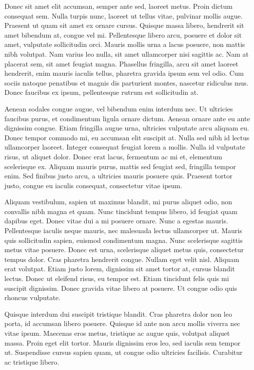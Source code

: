 \documentclass[11pt]{article}
\begin{document}
Donec sit amet elit accumsan, semper ante sed, laoreet metus. Proin dictum consequat sem. Nulla turpis nunc, laoreet ut tellus vitae, pulvinar mollis augue. Praesent ut quam sit amet ex ornare cursus. Quisque massa libero, hendrerit sit amet bibendum at, congue vel mi. Pellentesque libero arcu, posuere et dolor sit amet, vulputate sollicitudin orci. Mauris mollis urna a lacus posuere, non mattis nibh volutpat. Nam varius leo nulla, sit amet ullamcorper nisi sagittis ac. Nam at placerat sem, sit amet feugiat magna. Phasellus fringilla, arcu sit amet laoreet hendrerit, enim mauris iaculis tellus, pharetra gravida ipsum sem vel odio. Cum sociis natoque penatibus et magnis dis parturient montes, nascetur ridiculus mus. Donec faucibus ex ipsum, pellentesque rutrum est sollicitudin at.

Aenean sodales congue augue, vel bibendum enim interdum nec. Ut ultricies faucibus purus, et condimentum ligula ornare dictum. Aenean ornare ante eu ante dignissim congue. Etiam fringilla augue urna, ultricies vulputate arcu aliquam eu. Donec tempor commodo mi, eu accumsan elit suscipit at. Nulla sed nibh id lectus ullamcorper laoreet. Integer consequat feugiat lorem a mollis. Nulla id vulputate risus, ut aliquet dolor. Donec erat lacus, fermentum ac mi et, elementum scelerisque ex. Aliquam mauris purus, mattis sed feugiat sed, fringilla tempor enim. Sed finibus justo arcu, a ultricies mauris posuere quis. Praesent tortor justo, congue eu iaculis consequat, consectetur vitae ipsum.

Aliquam vestibulum, sapien ut maximus blandit, mi purus aliquet odio, non convallis nibh magna et quam. Nunc tincidunt tempus libero, id feugiat quam dapibus eget. Donec vitae dui a mi posuere ornare. Nunc a egestas mauris. Pellentesque iaculis neque mauris, nec malesuada lectus ullamcorper ut. Mauris quis sollicitudin sapien, euismod condimentum magna. Nunc scelerisque sagittis metus vitae posuere. Donec est urna, scelerisque aliquet metus quis, consectetur tempus dolor. Cras pharetra hendrerit congue. Nullam eget velit nisl. Aliquam erat volutpat. Etiam justo lorem, dignissim sit amet tortor at, cursus blandit lectus. Donec ut eleifend risus, eu tempor est. Etiam tincidunt felis quis mi suscipit dignissim. Donec gravida vitae libero at posuere. Ut congue odio quis rhoncus vulputate.

Quisque interdum dui suscipit tristique blandit. Cras pharetra dolor non leo porta, id accumsan libero posuere. Quisque id ante non arcu mollis viverra nec vitae ipsum. Maecenas eros metus, tristique ac augue quis, volutpat aliquet massa. Proin eget elit tortor. Mauris dignissim eros leo, sed iaculis sem tempor ut. Suspendisse cursus sapien quam, ut congue odio ultricies facilisis. Curabitur ac tristique libero.
\pagebreak
\end{document}
